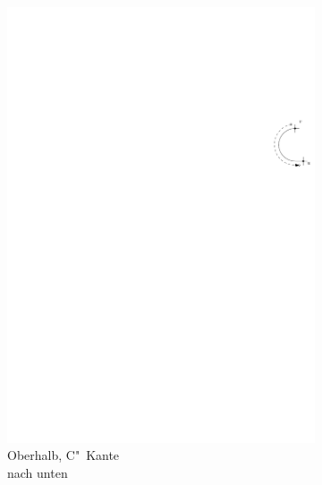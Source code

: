 \documentclass[a4paper]{scrreprt}
\theoremstyle{definition}
\begin{document}
\begin{figure}[h]
\begin{subfigure}[b]{0.2\textwidth}
                \includegraphics[width=\textwidth]{schnitt_finden/top_downwardsC}
                \caption{Oberhalb, C"~Kante \\ nach unten}
                \label{fig:cutfinding_top_downwardsC}
        \end{subfigure}
        \quad
        \begin{subfigure}[b]{0.2\textwidth}

\end{subfigure}
\end{figure}
\end{document}
